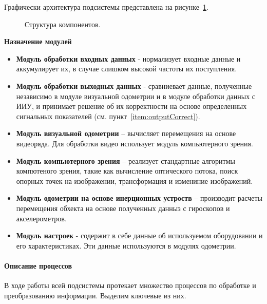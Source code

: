 Графически архитектура подсистемы представлена на рисунке~\ref{pic:acrhitec}.

\begin{figure}[!htb]
\caption{Структура компонентов.}
\label{pic:acrhitec}
\end{figure}

\textbf{Назначение модулей}

\begin{itemize}
\item \textbf{Модуль обработки входных данных} - нормализует входные данные и аккумулирует их, в случае слишком высокой частоты их поступления.
\item \textbf{Модуль обработки выходных данных} - сравниевает данные, полученные независимо в модуле визуальной одометрии и в модуле обработки данных с ИИУ, и принимает решение об их корректности на основе определенных сигнальных показателей (см. пункт~\ref{item:outputCorrect}).
\item \textbf{Модуль визуальной одометрии} – вычисляет перемещения на основе видеоряда. Для обработки видео использует модуль компьютерного зрения. 
\item \textbf{Модуль компьютерного зрения} – реализует стандартные алгоритмы компютеного зрения, такие как вычисление оптического потока, поиск опорных точек на изображении, трансформация и измениние изображений.
\item \textbf{Модуль одометрии на основе инерционных устроств} – производит расчеты перемещения обхекта на основе полученных данныз с гироскопов и акселерометров.
\item \textbf{Модуль настроек} - содержит в себе данные об используемом оборудовании и его характеристиках. Эти данные используются в модулях одометрии. 
\end{itemize}

\paragraph{Описание процессов}
В ходе работы всей подсистемы протекает множество процессов по обработке и преобразованию информации. Выделим ключевые из них.

